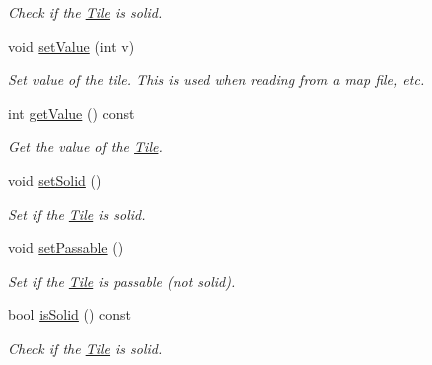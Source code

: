 \begin{DoxyCompactItemize}
\begin{DoxyCompactList}\small\item\em Check if the \hyperlink{classTile}{Tile} is solid. \end{DoxyCompactList}\item 
void \hyperlink{classTile_ae3d9e4ace265389dd0e0cf3d62ad6ff3}{set\+Value} (int v)\hypertarget{classTile_ae3d9e4ace265389dd0e0cf3d62ad6ff3}{}\label{classTile_ae3d9e4ace265389dd0e0cf3d62ad6ff3}

\begin{DoxyCompactList}\small\item\em Set value of the tile. This is used when reading from a map file, etc. \end{DoxyCompactList}\item 
int \hyperlink{classTile_aa426a6476fcf257bd0f79da4c3ed06aa}{get\+Value} () const \hypertarget{classTile_aa426a6476fcf257bd0f79da4c3ed06aa}{}\label{classTile_aa426a6476fcf257bd0f79da4c3ed06aa}

\begin{DoxyCompactList}\small\item\em Get the value of the \hyperlink{classTile}{Tile}. \end{DoxyCompactList}\item 
void \hyperlink{classTile_a3deac8e6d0ebd7b8352248201d264c38}{set\+Solid} ()\hypertarget{classTile_a3deac8e6d0ebd7b8352248201d264c38}{}\label{classTile_a3deac8e6d0ebd7b8352248201d264c38}

\begin{DoxyCompactList}\small\item\em Set if the \hyperlink{classTile}{Tile} is solid. \end{DoxyCompactList}\item 
void \hyperlink{classTile_a067099478c20b3f2fb56bc1c042a1e4e}{set\+Passable} ()\hypertarget{classTile_a067099478c20b3f2fb56bc1c042a1e4e}{}\label{classTile_a067099478c20b3f2fb56bc1c042a1e4e}

\begin{DoxyCompactList}\small\item\em Set if the \hyperlink{classTile}{Tile} is passable (not solid). \end{DoxyCompactList}\item 
bool \hyperlink{classTile_a8e67a56637124f73f3da572178dd4838}{is\+Solid} () const \hypertarget{classTile_a8e67a56637124f73f3da572178dd4838}{}\label{classTile_a8e67a56637124f73f3da572178dd4838}

\begin{DoxyCompactList}\small\item\em Check if the \hyperlink{classTile}{Tile} is solid. \end{DoxyCompactList}\end{DoxyCompactItemize}


